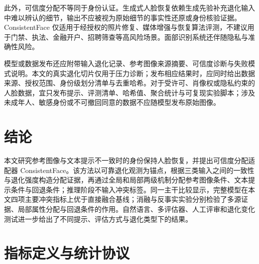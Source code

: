\documentclass[journal]{IEEEtran}
\begin{document}
此外，可信度分配不等同于身份认证。生成式人脸恢复依赖生成先验补充退化输入中难以辨认的细节\cite{wang2021gfpgan,zhou2022codeformer,lin2024diffbir}，输出不应被视为原始细节的事实性还原或身份核验证据。ConsistentFace 仅适用于经授权的照片修复、媒体增强与恢复算法评测，不建议用于门禁、执法、金融开户、招聘筛查等高风险场景。面部识别系统还伴随隐私与准确性风险\cite{nist2019frt,gao2020facialrecognition}。

模型或数据发布还应附带输入退化记录、参考图像来源摘要、可信度诊断与失败模式说明。本文的真实退化切片仅用于压力诊断；发布相应结果时，应同时给出数据来源、授权范围、身份级划分清单与去重哈希。对于受许可、肖像权或隐私约束的人脸数据，宜只发布提示、评测清单、哈希值、聚合统计与可复现实验脚本；涉及未成年人、敏感身份或不可撤回同意的数据不应随模型发布原始图像。

\section{结论}
\label{sec:main_conclusion}

本文研究参考图像与文本提示不一致时的身份保持人脸恢复，并提出可信度分配适配器 ConsistentFace。该方法以可靠退化观测为锚点，根据三类输入之间的一致性与退化强度构造分配证据，再通过全局和局部两级机制分配参考图像条件、文本提示条件与回退条件；推理阶段不输入冲突标签。同一主干比较显示，完整模型在本文四项主要冲突指标上优于直接融合基线；消融与反事实实验分别检验了多源证据、局部属性分配与回退条件的作用。自然语言、多评估器、人工评审和退化变化测试进一步给出了不同提示、评估方式与退化类型下的结果。

\appendices
\section{指标定义与统计协议}
\label{app:metric_definitions}
\end{document}
